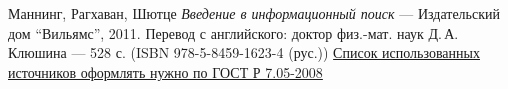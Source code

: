 \begin{thebibliography}{99}
Маннинг, Рагхаван, Шютце
{\itshape Введение в информационный поиск} --- Издательский дом \enquote{Вильямс}, 2011. Перевод с английского: доктор физ.-мат. наук Д.\,А.\, Клюшина --- 528 с. (ISBN 978-5-8459-1623-4 (рус.))
\href{http://www.ifap.ru/library/gost/7052008.pdf}{Список использованных источников оформлять нужно по  ГОСТ Р 7.05-2008}
\end{thebibliography}
\pagebreak


